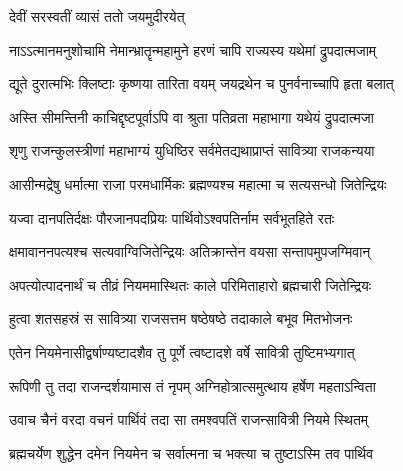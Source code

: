 \begin{center}
\newcommand{\onelineindentedshloka}[2]{
    {#1\hspace{\shlokaspaceskip}}\\
\onelineshloka{\hspace{\shlokaspaceskip}#2}}


{देवीं सरस्वतीं व्यासं ततो जयमुदीरयेत्}



\twolineshloka
{नाऽऽत्मानमनुशोचामि नेमान्भ्रातॄन्महामुने}
{हरणं चापि राज्यस्य यथेमां द्रुपदात्मजाम्} %


\twolineshloka
{द्यूते दुरात्मभिः क्लिष्टाः कृष्णया तारिता वयम्}
{जयद्रथेन च पुनर्वनाच्चापि हृता बलात्} %


\twolineshloka
{अस्ति सीमन्तिनी काचिद्दृष्टपूर्वाऽपि वा श्रुता}
{पतिव्रता महाभागा यथेयं द्रुपदात्मजा} %




\twolineshloka
{शृणु राजन्कुलस्त्रीणां महाभाग्यं युधिष्ठिर}
{सर्वमेतद्यथाप्राप्तं सावित्र्या राजकन्यया} %


\twolineshloka
{आसीन्मद्रेषु धर्मात्मा राजा परमधार्मिकः}
{ब्रह्मण्यश्च महात्मा च सत्यसन्धो जितेन्द्रियः} %


\twolineshloka
{यज्वा दानपतिर्दक्षः पौरजानपदप्रियः}
{पार्थिवोऽश्वपतिर्नाम सर्वभूतहिते रतः} %


\twolineshloka
{क्षमावाननपत्यश्च सत्यवाग्विजितेन्द्रियः}
{अतिक्रान्तेन वयसा सन्तापमुपजग्मिवान्} %


\twolineshloka
{अपत्योत्पादनार्थं च तीव्रं नियममास्थितः}
{काले परिमिताहारो ब्रह्मचारी जितेन्द्रियः} %


\twolineshloka
{हुत्वा शतसहस्रं स सावित्र्या राजसत्तम}
{षष्ठेषष्ठे तदाकाले बभूव मितभोजनः} %


\twolineshloka
{एतेन नियमेनासीद्वर्षाण्यष्टादशैव तु}
{पूर्णे त्वष्टादशे वर्षे सावित्री तुष्टिमभ्यगात्} %


\twolineshloka
{रूपिणी तु तदा राजन्दर्शयामास तं नृपम्}
{अग्निहोत्रात्समुत्थाय हर्षेण महताऽन्विता} %


\twolineshloka
{उवाच चैनं वरदा वचनं पार्थिवं तदा}
{सा तमश्वपतिं राजन्सावित्री नियमे स्थितम्} %


\twolineshloka
{ब्रह्मचर्येण शुद्धेन दमेन नियमेन च}
{सर्वात्मना च भक्त्या च तुष्टाऽस्मि तव पार्थिव} %



\end{center}
